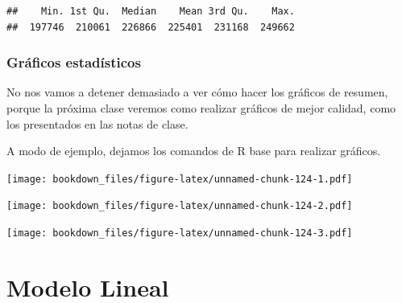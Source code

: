 \documentclass[]{book}
\newenvironment{Shaded}{\begin{snugshade}}{\end{snugshade}}
\newcommand{\KeywordTok}[1]{\textcolor[rgb]{0.13,0.29,0.53}{\textbf{#1}}}
\newcommand{\NormalTok}[1]{#1}
\newcommand{\OperatorTok}[1]{\textcolor[rgb]{0.81,0.36,0.00}{\textbf{#1}}}
\begin{document}
\begin{verbatim}
##    Min. 1st Qu.  Median    Mean 3rd Qu.    Max. 
##  197746  210061  226866  225401  231168  249662
\end{verbatim}

\hypertarget{graficos-estadisticos-1}{%
\subsection{Gráficos estadísticos}\label{graficos-estadisticos-1}}

No nos vamos a detener demasiado a ver cómo hacer los gráficos de resumen, porque la próxima clase veremos como realizar gráficos de mejor calidad, como los presentados en las notas de clase.

A modo de ejemplo, dejamos los comandos de R base para realizar gráficos.

\begin{Shaded}
\end{Shaded}

\texttt{[image: bookdown\_files/figure-latex/unnamed-chunk-124-1.pdf]}

\begin{Shaded}
\end{Shaded}

\texttt{[image: bookdown\_files/figure-latex/unnamed-chunk-124-2.pdf]}

\begin{Shaded}
\end{Shaded}

\texttt{[image: bookdown\_files/figure-latex/unnamed-chunk-124-3.pdf]}

\hypertarget{modelo-lineal}{%
\chapter{Modelo Lineal}\label{modelo-lineal}}
\end{document}
